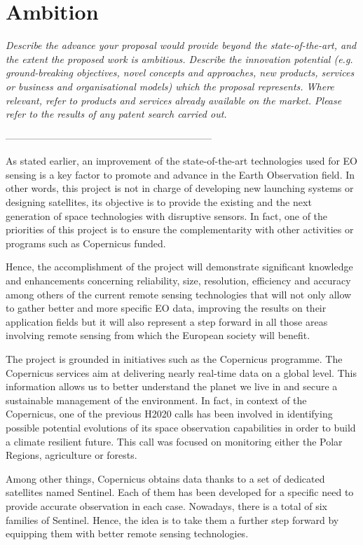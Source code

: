 \section{Ambition}

\textit{Describe the advance your proposal would provide beyond the state-of-the-art, and the extent the proposed work is ambitious.
Describe the innovation potential (e.g. ground-breaking objectives, novel concepts and approaches, new products, services or business and organisational models) which the proposal represents. Where relevant, refer to products and services already available on the market. Please refer to the results of any patent search carried out.}

---------------------------------------------------------------

As stated earlier, an improvement of the state-of-the-art technologies used for EO sensing is a key factor to promote and advance in the Earth Observation field. In other words, this project is not in charge of developing new launching systems or designing satellites, its objective is to provide the existing and the next generation of space technologies with disruptive sensors. In fact, one of the priorities of this project is to ensure the complementarity with other activities or programs such as Copernicus funded.

Hence, the accomplishment of the project will demonstrate significant knowledge and enhancements concerning reliability, size, resolution, efficiency and accuracy among others of the current remote sensing technologies that will not only allow to gather better and more specific EO data, improving the results on their application fields but it will also represent a step forward in all those areas involving remote sensing from which the European society will benefit. 

The project is grounded in initiatives such as the Copernicus programme. The Copernicus services aim at delivering nearly real-time data on a global level. This information allows us to better understand the planet we live in and secure a sustainable management of the environment. In fact, in context of the Copernicus, one of the previous H2020 calls has been involved in identifying possible potential evolutions of its space observation capabilities in order to build a climate resilient future. This call was focused on monitoring either the Polar Regions, agriculture or forests.

Among other things, Copernicus obtains data thanks to a set of dedicated satellites named Sentinel. Each of them has been developed for a specific need to provide accurate observation in each case. Nowadays, there is a total of six families of Sentinel. Hence, the idea is to take them a further step forward by equipping them with better remote sensing technologies. 